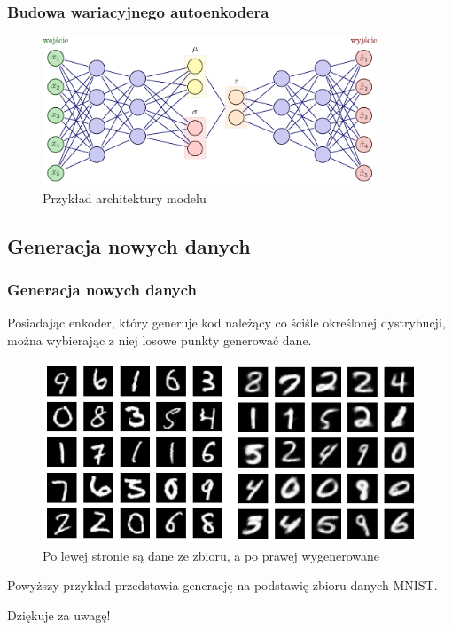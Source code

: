 \documentclass{beamer}
\begin{document}
	\begin{frame}
		\frametitle{Budowa wariacyjnego autoenkodera}
		\begin{figure}
			\centering\includegraphics[width=10cm]{tikzvae.pdf}
			\caption{Przykład architektury modelu}
		\end{figure}
	\end{frame}

	\begin{frame}
		\subsection{Generacja nowych danych}
		\frametitle{Generacja nowych danych}
		Posiadając enkoder, który generuje kod należący co ściśle określonej dystrybucji, można wybierając z niej losowe punkty generować dane. 
		
		\begin{figure}
			\centering\includegraphics{vaegeneracja.png} 
			\caption{Po lewej stronie są dane ze zbioru, a po prawej wygenerowane}
		\end{figure}
	
	Powyższy przykład przedstawia generację na podstawię zbioru danych MNIST.
		
	\end{frame}

	\begin{frame}
		\begin{center}
			\huge Dziękuje za uwagę!
		\end{center}
	\end{frame}
\end{document}
